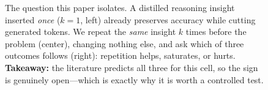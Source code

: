 \begin{figure}[t]
{}
\caption{The question this paper isolates. A distilled reasoning insight inserted
\emph{once} ($k{=}1$, left) already preserves accuracy while cutting generated
tokens. We repeat the \emph{same} insight $k$ times before the problem (center),
changing nothing else, and ask which of three outcomes follows (right): repetition
helps, saturates, or hurts. \textbf{Takeaway:} the literature predicts all three for
this cell, so the sign is genuinely open---which is exactly why it is worth a
controlled test.}
\label{fig:teaser}
\end{figure}
